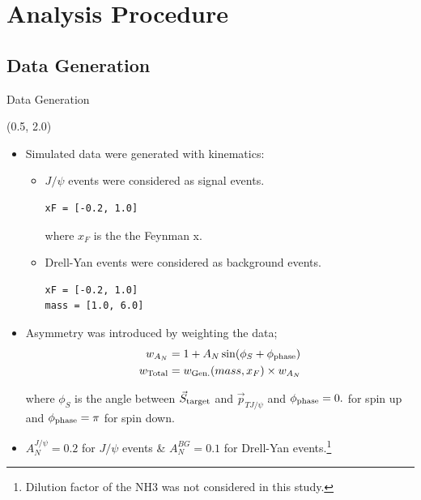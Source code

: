 \documentclass[10pt, xcolor={dvipsnames}, aspectratio = 169]{beamer}
\newcommand{\jpsi}{$J/\psi$ }
\begin{document}

%
%
\section{Analysis Procedure}

\subsection{Data Generation}

\begin{frame}[fragile]{Data Generation}

\begin{textblock}{14.0}(0.5, 2.0)

\begin{itemize}

\item Simulated data were generated with kinematics:

\begin{itemize}
\item \jpsi events were considered as signal events.

\begin{verbatim}
xF = [-0.2, 1.0]
\end{verbatim}
where $x_{F}$ is the the Feynman x.

\item Drell-Yan events were considered as background events.
\begin{verbatim}
xF = [-0.2, 1.0]
mass = [1.0, 6.0]
\end{verbatim}
\end{itemize}

\item Asymmetry was introduced by weighting the data;
\begin{align*}
w_{A_{N}} &= 1 + A_{N} \sin(\phi_{S} + \phi_{\rm phase})\\
w_{\text{Total}} &= w_{\text{Gen.}}(mass, x_{F}) \times w_{A_{N}}
\end{align*}

where $\phi_{S}$ is the angle between $\vec{S}_{\rm target}$ and $\vec{p}_{TJ/\psi}$ and $\phi_{\rm phase} = 0.$ for spin up and $\phi_{\rm phase} = \pi$ for spin down.

\item $A_{N}^{J/\psi} = 0.2$ for \jpsi events \& $A_{N}^{BG} = 0.1$ for Drell-Yan events.\footnote{\tiny{Dilution factor of the NH3 was not considered in this study.}}


\end{itemize}
\end{textblock}
\end{frame}
\end{document}
